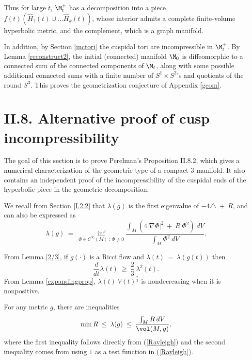 Thus for large $t$,  $\M_t^+$ has a decomposition into
a piece  $f(t) (\widehat{H}_1(t) \cup \ldots \widehat{H}_k(t))$, whose interior admits
a complete finite-volume hyperbolic metric, and the complement, which is a
graph manifold.

In addition, by Section \ref{inctori}
the cuspidal tori are incompressible in $\M_t^+$.
By Lemma \ref{reconstruct2},
the initial (connected) manifold $\M_0$ is diffeomorphic to a connected sum of
the connected components of $\M_t$, along with some possible additional connected sums
with a finite number of $S^1 \times S^2$'s and quotients of the round $S^3$.
This proves the geometrization conjecture of Appendix \ref{geom}.

\section{II.8. Alternative proof of cusp incompressibility} \label{II.8}

The goal of this section is to prove Perelman's Proposition II.8.2, which
gives a numerical characterization of
the geometric type of a compact $3$-manifold. It also contains an
independent proof of the incompressibility of the cuspidal ends
of the hyperbolic piece in the geometric decomposition.

We recall from Section \ref{I.2.2}
that $\lambda(g)$ is the first eigenvalue of
$-4 \triangle \: + \: R$, and can also be expressed as
\begin{equation} \label{Rayleigh}
\lambda(g) \: = \: \inf_{\Phi \in C^\infty(M) \: : \:
\Phi \neq 0} \frac{\int_M \left( 4 |\nabla \Phi|^2 \: + \:
R \: \Phi^2 \right) \: dV}{\int_M \Phi^2 \: dV}.
\end{equation}

From Lemma \ref{2/3}, if $g(\cdot)$ is a Ricci flow and
$\lambda(t) \: = \: \lambda(g(t))$ then
\begin{equation} \label{ll}
\frac{d}{dt} \lambda(t) \: \ge \: \frac23 \:
\lambda^2(t).
\end{equation}
From Lemma \ref{expandingprop},
$\lambda(t) \: V(t)^{\frac23}$ is nondecreasing
when it is nonpositive.

For any metric $g$, there are inequalities
\begin{equation} \label{test}
\min R \: \le \: \lambda(g) \: \le \: \frac{\int_M R \: dV}{\vol(M, g)},
\end{equation}
where the first inequality follows directly from (\ref{Rayleigh})
and the second inequality comes from using $1$ as a
test function in (\ref{Rayleigh}).



